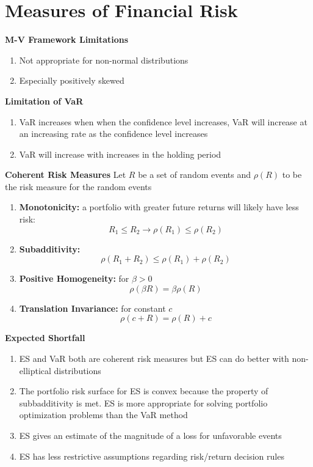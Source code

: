 \documentclass[11pt,fleqn]{book} %
\numberwithin{equation}{section} %
\numberwithin{figure}{section} %
\numberwithin{table}{section} %
\begin{document}
\chapter{Measures of Financial Risk}
\begin{definition}\textbf{M-V Framework Limitations}
\begin{enumerate}
    \item Not appropriate for non-normal distributions
    \item Especially positively skewed
\end{enumerate}
\end{definition}
\begin{definition}\textbf{Limitation of VaR}
\begin{enumerate}
    \item VaR increases when when the confidence level increases, VaR will increase at an increasing rate as the confidence level increases
    \item VaR will increase with increases in the holding period
\end{enumerate}
\end{definition}
\begin{definition}
\textbf{Coherent Risk Measures}
Let $R$ be a set of random events and $\rho(R)$ to be the risk measure for the random events
\begin{enumerate}
    \item \textbf{Monotonicity:} a portfolio with greater future returns will likely have less risk:
    $$
    R_1\leq R_2\to\rho(R_1)\leq\rho(R_2)
    $$
    \item \textbf{Subadditivity:}
    $$
    \rho(R_1+R_2)\leq \rho(R_1)+\rho(R_2)
    $$
    \item \textbf{Positive Homogeneity:} for $\beta>0$
    $$
    \rho(\beta R)=\beta\rho(R)
    $$
    \item \textbf{Translation Invariance:} for constant $c$
    $$
    \rho(c+R)=\rho(R)+c
    $$
\end{enumerate}
\end{definition}
\begin{definition}\textbf{Expected Shortfall}\\
\begin{enumerate}
    \item ES and VaR both are coherent risk measures but ES can do better with non-elliptical distributions
    \item The portfolio risk surface for ES is convex because the property of subbadditivity is met. ES is more appropriate for solving portfolio optimization problems than the VaR method
    \item ES gives an estimate of the magnitude of a loss for unfavorable events
    \item ES has less restrictive assumptions regarding risk/return decision rules
\end{enumerate}


\end{definition}
\end{document}
